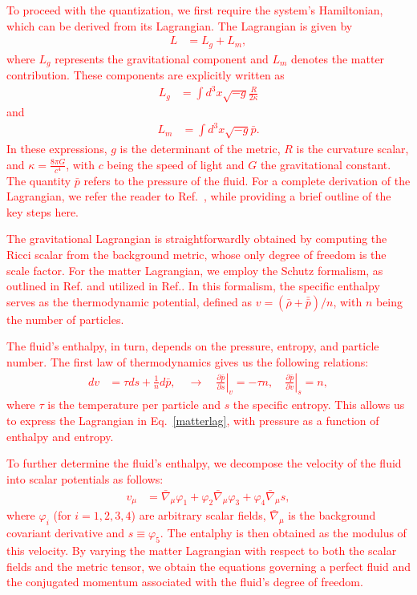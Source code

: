 \documentclass[a4paper,11pt]{article}
\begin{document}
    \textcolor{red}{To proceed with the quantization, we first require the system's Hamiltonian, which can be derived from its Lagrangian. The Lagrangian is given by
    \begin{align}
        L &= L_g + L_m
    ,\end{align}
    where $L_g$ represents the gravitational component and $L_m$ denotes the matter contribution. These components are explicitly written as
    \begin{align}
    L_g &= \int d^3x \sqrt{-g}\frac{R}{2\kappa}
    \end{align}
    and
    \begin{align}
    \label{matterlag}
    L_m &= \int d^3x \sqrt{-g}\bar{p}
    .\end{align}
    In these expressions, $g$ is the determinant of the metric, $R$ is the curvature scalar, and $\kappa = \frac{8 \pi G}{c^4}$, with $c$ being the speed of light and $G$ the gravitational constant. The quantity $\bar{p}$ refers to the pressure of the fluid. For a complete derivation of the Lagrangian, we refer the reader to Ref.~\cite{fluidgeral}, while providing a brief outline of the key steps here.}
    
    \textcolor{red}{The gravitational Lagrangian is straightforwardly obtained by computing the Ricci scalar from the background metric, whose only degree of freedom is the scale factor. For the matter Lagrangian, we employ the Schutz formalism, as outlined in Ref.\cite{Schutz} and utilized in Ref.\cite{fluidgeral}. In this formalism, the specific enthalpy serves as the thermodynamic potential, defined as $v = (\bar{\rho} + \bar{\bar{p}})/n$, with $n$ being the number of particles.} 
    
    \textcolor{red}{The fluid's enthalpy, in turn, depends on the pressure, entropy, and particle number. The first law of thermodynamics gives us the following relations:
    \begin{align}
        dv &= \tau ds + \frac{1}{n} d\bar{p}, \quad \rightarrow \quad \left.\frac{\partial \bar{p}}{\partial s}\right|_v = -\tau n, \quad \left.\frac{\partial \bar{p}}{\partial v}\right|_s = n
    ,\end{align}
    where $\tau$ is the temperature per particle and $s$ the specific entropy. This allows us to express the Lagrangian in Eq.~\eqref{matterlag}, with pressure as a function of enthalpy and entropy.}
    
    \textcolor{red}{To further determine the fluid's enthalpy, we decompose the velocity of the fluid into scalar potentials as follows:}
\textcolor{red}{
\begin{align} v_\mu &= \bar\nabla_\mu \varphi_1 + \varphi_2 \bar\nabla_\mu \varphi_3 + \varphi_4 \bar\nabla_\mu s ,\end{align}
where $\varphi_i$ (for $i = 1, 2, 3, 4$) are arbitrary scalar fields, $\bar{\nabla}_\mu$ is the background covariant derivative and $s \equiv \varphi_5$. The entalphy is then obtained as the modulus of this velocity. By varying the matter Lagrangian with respect to both the scalar fields and the metric tensor, we obtain the equations governing a perfect fluid and the conjugated momentum associated with the fluid's degree of freedom.}
     
\end{document}
